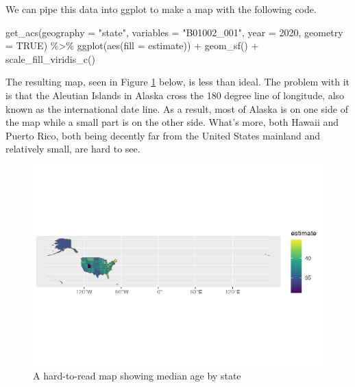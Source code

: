 \documentclass[
]{book}
\newenvironment{Shaded}{\begin{snugshade}}{\end{snugshade}}
\newcommand{\AttributeTok}[1]{\textcolor[rgb]{0.77,0.63,0.00}{#1}}
\newcommand{\ConstantTok}[1]{\textcolor[rgb]{0.00,0.00,0.00}{#1}}
\newcommand{\DecValTok}[1]{\textcolor[rgb]{0.00,0.00,0.81}{#1}}
\newcommand{\FunctionTok}[1]{\textcolor[rgb]{0.00,0.00,0.00}{#1}}
\newcommand{\NormalTok}[1]{#1}
\newcommand{\SpecialCharTok}[1]{\textcolor[rgb]{0.00,0.00,0.00}{#1}}
\newcommand{\StringTok}[1]{\textcolor[rgb]{0.31,0.60,0.02}{#1}}
\begin{document}
We can pipe this data into ggplot to make a map with the following code.

\begin{Shaded}
\begin{Highlighting}[]
\FunctionTok{get\_acs}\NormalTok{(}\AttributeTok{geography =} \StringTok{"state"}\NormalTok{,}
        \AttributeTok{variables =} \StringTok{"B01002\_001"}\NormalTok{,}
        \AttributeTok{year =} \DecValTok{2020}\NormalTok{,}
        \AttributeTok{geometry =} \ConstantTok{TRUE}\NormalTok{) }\SpecialCharTok{\%\textgreater{}\%} 
  \FunctionTok{ggplot}\NormalTok{(}\FunctionTok{aes}\NormalTok{(}\AttributeTok{fill =}\NormalTok{ estimate)) }\SpecialCharTok{+}
  \FunctionTok{geom\_sf}\NormalTok{() }\SpecialCharTok{+}
  \FunctionTok{scale\_fill\_viridis\_c}\NormalTok{()}
\end{Highlighting}
\end{Shaded}

The resulting map, seen in Figure \ref{fig:median-age-map-bad} below, is less than ideal. The problem with it is that the Aleutian Islands in Alaska cross the 180 degree line of longitude, also known as the international date line. As a result, most of Alaska is on one side of the map while a small part is on the other side. What's more, both Hawaii and Puerto Rico, both being decently far from the United States mainland and relatively small, are hard to see.

\begin{figure}
\includegraphics[width=1\linewidth]{tidycensus_files/figure-latex/median-age-map-bad-1} \caption{A hard-to-read map showing median age by state}\label{fig:median-age-map-bad}
\end{figure}
\end{document}
